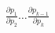 \documentclass[preview]{standalone}
\begin{document}
\begin{align*}
\frac{\partial p_1}{\partial p_2} \ldots \frac{\partial p_{k-1}}{\partial p_k}
\end{align*}
\end{document}
